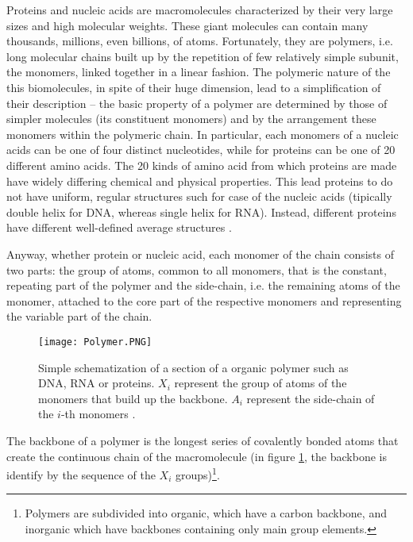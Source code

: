 Proteins and nucleic acids are macromolecules characterized by their very large sizes and high molecular weights. These giant molecules can contain many thousands, millions, even billions, of atoms. Fortunately, they are polymers, i.e. long molecular chains built up by the repetition of few relatively simple subunit, the monomers, linked together in a linear fashion. The polymeric nature of the this biomolecules, in spite of their huge dimension, lead to a simplification of their description -- the basic property of a polymer are determined by those of simpler molecules (its constituent monomers) and by the arrangement these monomers within the polymeric chain. In particular, each monomers of a nucleic acids can be one of four distinct nucleotides, while for proteins can be one of 20 different amino acids. The 20 kinds of amino acid from which proteins are made have widely differing chemical and physical properties. This lead proteins to do not have uniform, regular structures such for case of the nucleic acids (tipically double helix for DNA, whereas single helix for RNA). Instead, different proteins have different well-defined average structures \cite{voet2016fundamentals}.

Anyway, whether protein or nucleic acid, each monomer of the chain consists of two parts: 
the group of atoms, common to all monomers, that  is the constant, repeating part of the polymer and the side-chain, i.e. the remaining atoms of the monomer, attached to the core part of the respective monomers and representing the variable part of the chain.

\begin{figure}[h]
\centering
\begin{minipage}[t]{0.8\textwidth}
\centering
\texttt{[image: Polymer.PNG]}

\caption{\small{Simple schematization of a section of a organic polymer such as DNA, RNA or proteins. $X_i$ represent the group of atoms of the monomers that build up the backbone. $A_i$ represent the side-chain of the $i$-th monomers
 \cite{creighton2010biophysical}.}}

\label{fig:Polymer}
\end{minipage} 
\end{figure}

The backbone of a polymer is the longest series of covalently bonded atoms that create the continuous chain of the macromolecule (in figure \ref{fig:Polymer}, the backbone is identify by the sequence of the $X_i$ groups)\footnote{Polymers are subdivided into organic, which have a carbon backbone, and inorganic which have backbones containing only main group elements.}. %

